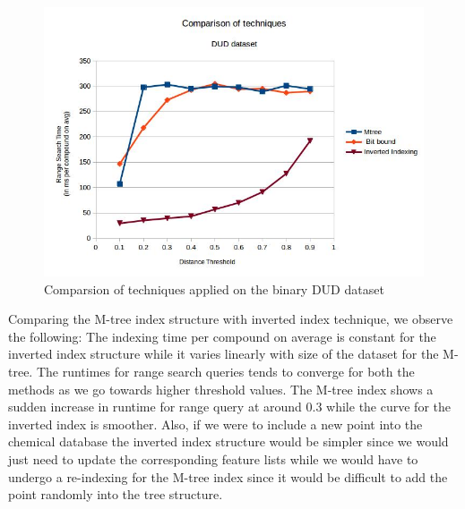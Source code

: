 \begin{figure}[ht!]	
\centering
\includegraphics[width=0.75 \columnwidth]{img/imageC3.jpg}
\caption{Comparsion of techniques applied on the binary DUD dataset}
\label{fig:5C3}
\end{figure}

Comparing the M-tree index structure with inverted index technique, we observe the following: The indexing time  per compound on average is constant for the inverted index structure while it varies linearly with size of the dataset for the M-tree. The runtimes for range search queries tends to converge for both the methods as we go towards higher threshold values. The M-tree index shows a sudden increase in runtime for range query at around 0.3 while the curve for the inverted index is smoother. Also, if we were to include a new point into the chemical database the inverted index structure would be simpler since we would just need to update the corresponding feature lists while we would have to undergo a re-indexing for the M-tree index since it would be difficult to add the point randomly into the tree structure.

